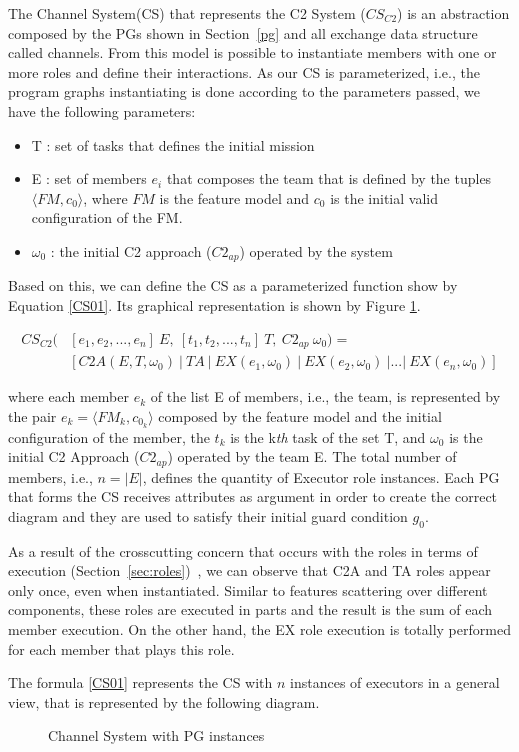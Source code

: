 The Channel System(CS) that represents the C2 System ($CS_{C2}$) is an abstraction composed by the PGs shown in Section~\ref{pg} and all exchange data structure called channels. From this model is possible to instantiate members with one or more roles and define their interactions. As our CS is parameterized, i.e., the program graphs instantiating is done according to the parameters passed, we have the following parameters:

\begin{itemize}
    \item T : set of tasks that defines the initial mission
    \item E : set of members $e_i$ that composes the team that is defined by the tuples $\langle FM, c_0\rangle$, where $FM$ is the feature model and $c_0$ is the initial valid configuration of the FM. 
    \item $\omega_0$ : the initial C2 approach ($C2_{ap}$) operated by the system
\end{itemize}

Based on this, we can define the CS as a parameterized function show by Equation \ref{CS01}. Its graphical representation is shown by Figure \ref{cs02}.

\begin{equation}
\label{CS01}
\begin{aligned}
CS_{C2}(&[e_1, e_2, ..., e_n]\ E,\ [t_1, t_2, ..., t_n]\ T,\ C2_{ap}\ \omega_0) = \\
&[C2A(E,T,\omega_0)\ |\ TA\ |\ EX(e_1, \omega_0)\ |\ EX(e_2, \omega_0)\ |...|\ EX(e_n, \omega_0)]
\end{aligned}
\end{equation}

where each member $e_k$ of the list E of members, i.e., the team, is represented by the pair $e_k=\langle FM_k,c_{0_k} \rangle$ composed by the feature model and the initial configuration of the member, the $t_k$ is the k\textit{th} task of the set T, and $\omega_0$ is the initial C2 Approach ($C2_{ap}$) operated by the team E. The total number of members, i.e., $n=|E|$, defines the quantity of Executor role instances. Each PG that forms the CS receives attributes as argument in order to create the correct diagram and they are used to satisfy their initial guard condition $g_0$.

As a result of the crosscutting concern that occurs with the roles in terms of execution (Section~\ref{sec:roles})~\cite{Apel2013}, we can observe that C2A and TA roles appear only once, even when instantiated. Similar to features scattering over different components, these roles are executed in parts and the result is the sum of each member execution. On the other hand, the EX role execution is totally performed for each member that plays this role. 

The formula \ref{CS01} represents the CS with $n$ instances of executors in a general view, that is represented by the following diagram.

\begin{figure}[h]
\centering
\label{cs02}
\scalebox{1}{}
\caption{Channel System with PG instances}
\end{figure}
